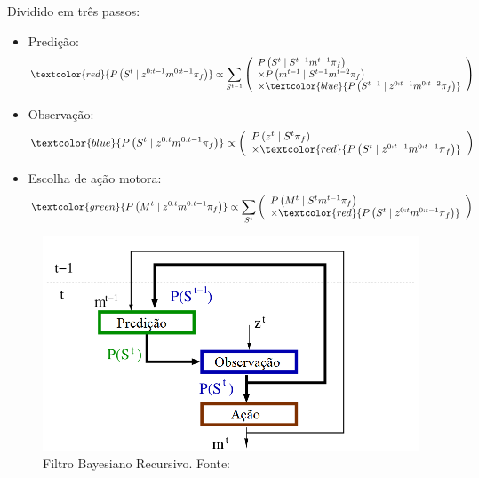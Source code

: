 \documentclass{beamer}
\begin{document}
\begin{frame}
Dividido em três passos:
\begin{itemize}
	\item Predição: $$
	\textcolor{red}{ P \left( S^t \mid z^{0: t-1} m^{0: t-1} \pi_f \right) } \propto \sum\limits_{S^{t-1}}
        \left(
            \begin{array}{l}
                P \left( S^t \mid S^{t-1} m^{t-1} \pi_f \right) \\
                \times P \left( m^{t-1} \mid S^{t-1} m^{t-2} \pi_f \right)\\
                \times \textcolor{blue}{ P \left( S^{t-1} \mid z^{0: t-1} m^{0: t-2} \pi_f \right) }
            \end{array}
        \right)
    $$\pause
	\item Observação: $$
	\textcolor{blue}{ P \left( S^t \mid z^{0: t} m^{0: t-1} \pi_f \right) } \propto 
        \left(
            \begin{array}{l}
                P \left( z^t \mid S^t \pi_f \right) \\
                \times \textcolor{red}{ P \left( S^t \mid z^{0: t-1} m^{0: t-1} \pi_f \right) }
            \end{array}
        \right)
    $$\pause
	\item Escolha de ação motora: $$
	\textcolor{green}{ P \left( M^t \mid z^{0: t} m^{0: t-1} \pi_f \right) } \propto \sum\limits_{S^t}
        \left(
            \begin{array}{l}
                P \left( M^t \mid S^t m^{t-1} \pi_f \right)\\
                \times \textcolor{red}{ P \left( S^t \mid z^{0: t} m^{0: t-1} \pi_f \right) }
            \end{array}
        \right)
    $$
\end{itemize}
\end{frame}


\begin{frame}

\begin{figure}[h]
    \centering
    \includegraphics[width=\linewidth]{images/modelo_bayesiano-carla}
    \caption{\label{img:ModeloProbabilisticoCarla}Filtro Bayesiano Recursivo. Fonte: \cite{Koike:2005}}
\end{figure}
\end{frame}
\end{document}
